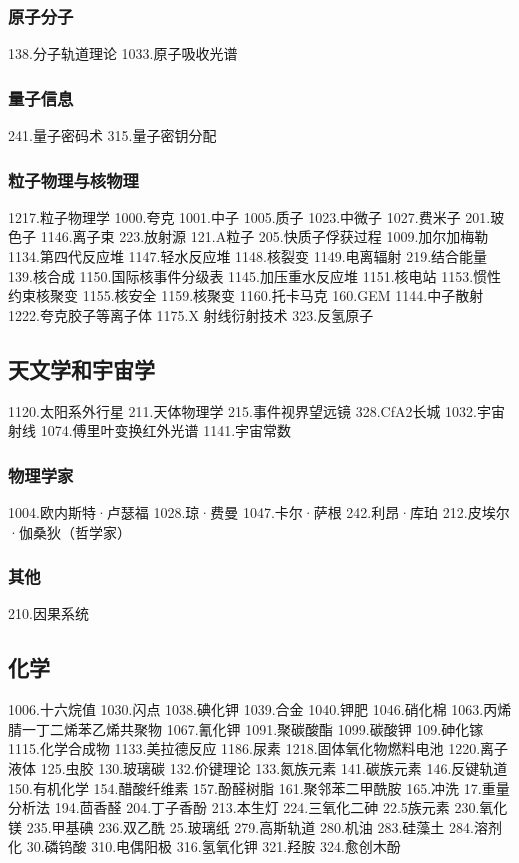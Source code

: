 \subsubsection{原子分子}
138.分子轨道理论
1033.原子吸收光谱
\subsubsection{量子信息}
241.量子密码术
315.量子密钥分配
\subsubsection{粒子物理与核物理}
1217.粒子物理学
1000.夸克
1001.中子
1005.质子
1023.中微子
1027.费米子
201.玻色子
1146.离子束
223.放射源
121.Α粒子
205.快质子俘获过程
1009.加尔加梅勒
1134.第四代反应堆
1147.轻水反应堆
1148.核裂变
1149.电离辐射
219.结合能量
139.核合成
1150.国际核事件分级表
1145.加压重水反应堆
1151.核电站
1153.惯性约束核聚变
1155.核安全
1159.核聚变
1160.托卡马克
160.GEM
1144.中子散射
1222.夸克胶子等离子体
1175.X 射线衍射技术
323.反氢原子


\subsection{天文学和宇宙学}
1120.太阳系外行星
211.天体物理学
215.事件视界望远镜
328.CfA2长城
1032.宇宙射线
1074.傅里叶变换红外光谱
1141.宇宙常数
\subsubsection{物理学家}
1004.欧内斯特·卢瑟福
1028.琼·费曼
1047.卡尔·萨根
242.利昂·库珀
212.皮埃尔·伽桑狄（哲学家）

\subsubsection{其他}
210.因果系统

\subsection{化学}
1006.十六烷值
1030.闪点
1038.碘化钾
1039.合金
1040.钾肥
1046.硝化棉
1063.丙烯腈一丁二烯苯乙烯共聚物
1067.氰化钾
1091.聚碳酸酯
1099.碳酸钾
109.砷化镓
1115.化学合成物
1133.美拉德反应
1186.尿素
1218.固体氧化物燃料电池
1220.离子液体
125.虫胶
130.玻璃碳
132.价键理论
133.氮族元素
141.碳族元素
146.反键轨道
150.有机化学
154.醋酸纤维素
157.酚醛树脂
161.聚邻苯二甲酰胺
165.冲洗
17.重量分析法
194.茴香醛
204.丁子香酚
213.本生灯
224.三氧化二砷
22.5族元素
230.氧化镁
235.甲基碘
236.双乙酰
25.玻璃纸
279.高斯轨道
280.机油
283.硅藻土
284.溶剂化
30.磷钨酸
310.电偶阳极
316.氢氧化钾
321.羟胺
324.愈创木酚

